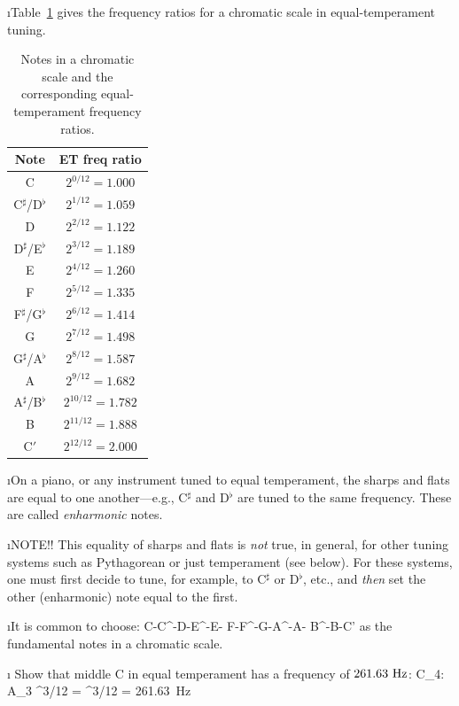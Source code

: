 \i Table~\ref{t:equal-temperament} gives the frequency
ratios for a chromatic scale in equal-temperament tuning.
%
\begin{table}[htbp]
\begin{center}
\begin{tabular}{|c|c|}
\hline
Note & ET freq ratio \\
\hline
C & $2^{0/12}=1.000$ \\
C$^\sharp$/D$^\flat$ & $2^{1/12}=1.059$ \\
D & $2^{2/12}=1.122$ \\
D$^\sharp$/E$^\flat$ & $2^{3/12}=1.189$ \\
E & $2^{4/12}=1.260$ \\
F & $2^{5/12}=1.335$ \\
F$^\sharp$/G$^\flat$ & $2^{6/12}=1.414$ \\
G & $2^{7/12}=1.498$ \\
G$^\sharp$/A$^\flat$ & $2^{8/12}=1.587$ \\
A & $2^{9/12}=1.682$ \\
A$^\sharp$/B$^\flat$ & $2^{10/12}=1.782$ \\
B & $2^{11/12}=1.888$ \\
C$'$ & $2^{12/12}=2.000$ \\
\hline
\end{tabular}
\caption{Notes in a chromatic scale and the 
corresponding equal-temperament frequency ratios.}
\label{t:equal-temperament}
\end{center}
\end{table}

\i On a piano, or any instrument tuned to
equal temperament, the sharps and flats are equal
to one another---e.g., C${}^\sharp$ and D${}^\flat$
are tuned to the same frequency.
These are called {\em enharmonic} notes.

\i NOTE!! This equality of sharps and flats is
{\em not} true, in general, for other tuning systems
such as Pythagorean or just temperament 
(see below).
For these systems, one must first decide to tune,
for example, to C$^\sharp$ or D$^\flat$, etc., and 
{\em then} set the other (enharmonic) note equal to the first.

\i It is common to choose:
% 
\be
{\rm C}-{\rm C}^\sharp-{\rm D}-{\rm E}^\flat-{\rm E}-%
{\rm F}-{\rm F}^\sharp-{\rm G}-{\rm A}^\flat-{\rm A}-%
{\rm B}^\flat-{\rm B}-{\rm C}'
\nonumber
\ee
%
as the fundamental notes in a chromatic scale.

\i \exer 
Show that middle C in equal temperament has a frequency
of $261.63~{\rm Hz}$:
%
\be
{\rm C}_4:\quad 
{\rm A}_3 ^{3/12} =
^{3/12} = 261.63~{\rm Hz}
\ee

